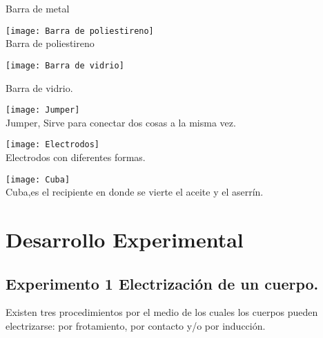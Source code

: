 \documentclass[10pt]{article}
\begin{document}
\begin{multicols}{2}
\begin{center}
		Barra de metal

	\end{center}

	\begin{center}


		\texttt{[image: Barra de poliestireno]}\\

		Barra de poliestireno

	\end{center}

	\begin{center}

		\texttt{[image: Barra de vidrio]}

		Barra de vidrio.
	\end{center}


	\begin{center}

		\texttt{[image: Jumper]}\\

		Jumper, Sirve para conectar dos cosas a la misma vez.
	\end{center}

	\begin{center}

		\texttt{[image: Electrodos]}\\

		Electrodos con diferentes formas.

	\end{center}

	\begin{center}

		\texttt{[image: Cuba]}\\

		Cuba,es el recipiente en donde se vierte el aceite y el aserrín.

	\end{center}

	\section{Desarrollo Experimental}
	\subsection{Experimento 1 Electrización de un cuerpo.} 

	Existen tres procedimientos por el medio de los cuales los cuerpos pueden electrizarse: por frotamiento, por contacto y/o por inducción.


\end{multicols}
\end{document}
